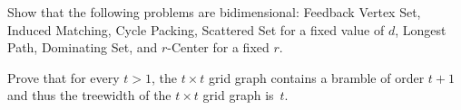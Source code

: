 \documentclass{uebung_cs}
\begin{document}
\begin{exercise}[Bidimensionality]
  Show that the following problems are bidimensional: Feedback Vertex Set, Induced Matching, Cycle Packing, Scattered Set for a fixed value of $d$, Longest Path, Dominating Set, and $r$-Center for a fixed $r$.
\end{exercise}

\begin{exercise}
  Prove that for every $t > 1$, the $t\times t$ grid graph contains a bramble of order $t + 1$ and thus the treewidth of the $t\times t$ grid graph is~$t$.
\end{exercise}
\end{document}
